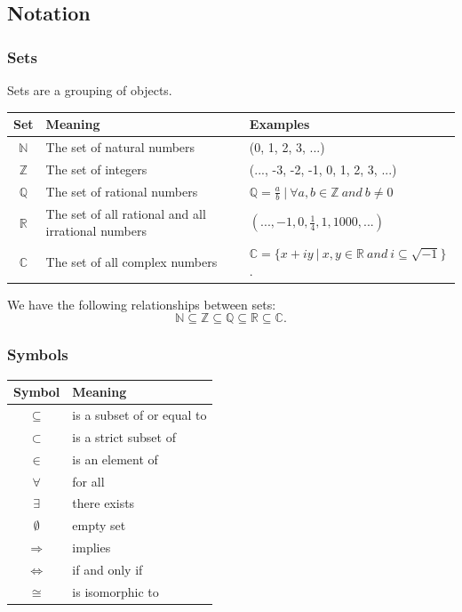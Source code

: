 \documentclass{article}
\begin{document}
\subsection{Notation}

\subsubsection{Sets}
Sets are a grouping of objects.
\begin{center}
    \begin{tabular}{c|p{6cm}|p{5cm}}
        Set & Meaning & Examples \\
        \hline
        $\mathbb{N}$ & The set of natural numbers & (0, 1, 2, 3, ...)\\
        $\mathbb{Z}$ & The set of integers & (..., -3, -2, -1, 0, 1, 2, 3, ...)\\
        $\mathbb{Q}$ & The set of rational numbers & \(\mathbb{Q} = {\frac{a}{b}\:|\:\forall a,b \in \mathbb{Z}\:and\:b \neq 0}\)\\
        $\mathbb{R}$ & The set of all rational and all irrational numbers & \((...,-1,0,\frac{1}{4},1,1000,...)\)\\
        $\mathbb{C}$ & The set of all complex numbers & \(\mathbb{C} = \{x + iy\:|\:x,y \in \mathbb{R}\:and\:i \subseteq \sqrt{-1}\}\).\\
    \end{tabular}
\end{center}
We have the following relationships between sets:
\[\mathbb{N} \subseteq \mathbb{Z} \subseteq \mathbb{Q} \subseteq \mathbb{R} \subseteq \mathbb{C}.\]

\subsubsection{Symbols}
\begin{center}
    \begin{tabular}{c|l}
        Symbol & Meaning \\
        \hline
        $\subseteq$ & is a subset of or equal to \\
        $\subset$ & is a strict subset of \\
        $\in$ & is an element of \\
        $\forall$ & for all \\
        $\exists$ & there exists \\
        $\emptyset$ & empty set \\
        $\Rightarrow$ & implies \\
        $\Leftrightarrow$ & if and only if \\
        $\cong$ & is isomorphic to\footnotemark
    \end{tabular}
\end{center}
\end{document}
